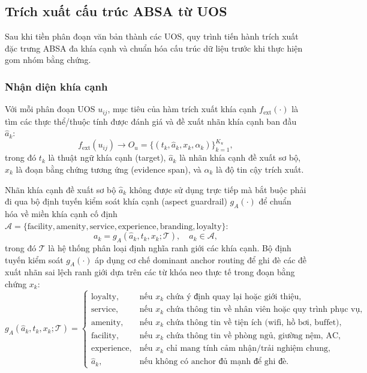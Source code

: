 \subsection{Trích xuất cấu trúc ABSA từ UOS}
\label{subsec:method1-absa-extraction}

Sau khi tiền phân đoạn văn bản thành các UOS, quy trình tiến hành trích xuất đặc trưng ABSA đa khía cạnh và chuẩn hóa cấu trúc dữ liệu trước khi thực hiện gom nhóm bằng chứng.

\subsubsection{Nhận diện khía cạnh}
\label{subsubsec:method1-aspect-detection}

Với mỗi phân đoạn UOS $u_{ij}$, mục tiêu của hàm trích xuất khía cạnh $f_{\mathrm{ext}}(\cdot)$ là tìm các thực thể/thuộc tính được đánh giá và đề xuất nhãn khía cạnh ban đầu $\hat{a}_k$:
\begin{equation}
f_{\mathrm{ext}}(u_{ij}) \rightarrow O_u = \{(t_k, \hat{a}_k, x_k, \alpha_k)\}_{k=1}^{K_u},
\label{eq:method1-aspect-extraction-function}
\end{equation}
trong đó $t_k$ là thuật ngữ khía cạnh (target), $\hat{a}_k$ là nhãn khía cạnh đề xuất sơ bộ, $x_k$ là đoạn bằng chứng tương ứng (evidence span), và $\alpha_k$ là độ tin cậy trích xuất.

Nhãn khía cạnh đề xuất sơ bộ $\hat{a}_k$ không được sử dụng trực tiếp mà bắt buộc phải đi qua bộ định tuyến kiểm soát khía cạnh (aspect guardrail) $g_A(\cdot)$ để chuẩn hóa về miền khía cạnh cố định $\mathcal{A} = \{\mathrm{facility}, \mathrm{amenity}, \mathrm{service}, \mathrm{experience}, \mathrm{branding}, \mathrm{loyalty}\}$:
\begin{equation}
a_k = g_A(\hat{a}_k, t_k, x_k; \mathcal{T}), \quad a_k \in \mathcal{A},
\label{eq:method1-aspect-guardrail}
\end{equation}
trong đó $\mathcal{T}$ là hệ thống phân loại định nghĩa ranh giới các khía cạnh. Bộ định tuyến kiểm soát $g_A(\cdot)$ áp dụng cơ chế dominant anchor routing để ghi đè các đề xuất nhãn sai lệch ranh giới dựa trên các từ khóa neo thực tế trong đoạn bằng chứng $x_k$:
\begin{equation}
g_A(\hat{a}_k, t_k, x_k; \mathcal{T}) = \begin{cases}
\mathrm{loyalty}, & \text{nếu } x_k \text{ chứa ý định quay lại hoặc giới thiệu},\\
\mathrm{service}, & \text{nếu } x_k \text{ chứa thông tin về nhân viên hoặc quy trình phục vụ},\\
\mathrm{amenity}, & \text{nếu } x_k \text{ chứa thông tin về tiện ích (wifi, hồ bơi, buffet)},\\
\mathrm{facility}, & \text{nếu } x_k \text{ chứa thông tin về phòng ngủ, giường nệm, AC},\\
\mathrm{experience}, & \text{nếu } x_k \text{ chỉ mang tính cảm nhận/trải nghiệm chung},\\
\hat{a}_k, & \text{nếu không có anchor đủ mạnh để ghi đè.}
\end{cases}
\label{eq:method1-dominant-anchor-routing}
\end{equation}


